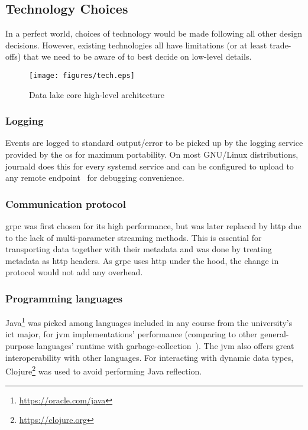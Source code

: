 \subsection{Technology Choices}
In a perfect world, choices of technology would be made following
all other design decisions.  However, existing technologies all have
limitations (or at least trade-offs) that we need to be aware of to best
decide on low-level details.

\begin{figure}\centering
  \texttt{[image: figures/tech.eps]}
  \caption{Data lake core high-level architecture}
  \label{tech}
\end{figure}

\subsubsection{Logging}
Events are logged to standard output/error to be picked up
by the logging service provided by the \gls{os} for maximum portability.
On most GNU/Linux distributions, journald does this for every systemd service
and can be configured to upload to any remote endpoint~\cite{journal}
for debugging convenience.

\subsubsection{Communication protocol}
\gls{grpc} was first chosen for its high performance, but was later replaced
by \gls{http} due to the lack of multi-parameter streaming methods.  This is
essential for transporting data together with their metadata and was done
by treating metadata as \gls{http} headers.  As \gls{grpc} uses \gls{http}
under the hood, the change in protocol would not add any overhead.

\subsubsection{Programming languages}
Java\footnote{\url{https://oracle.com/java}} was picked among languages
included in any course from the university's \gls{ict} major, for \gls{jvm}
implementations' performance (comparing to other general-purpose languages'
runtime with garbage-collection~\cite{game}).  The \gls{jvm} also offers
great interoperability with other languages.  For interacting with dynamic data
types, Clojure\footnote{\url{https://clojure.org}} was used to avoid
performing Java reflection.

